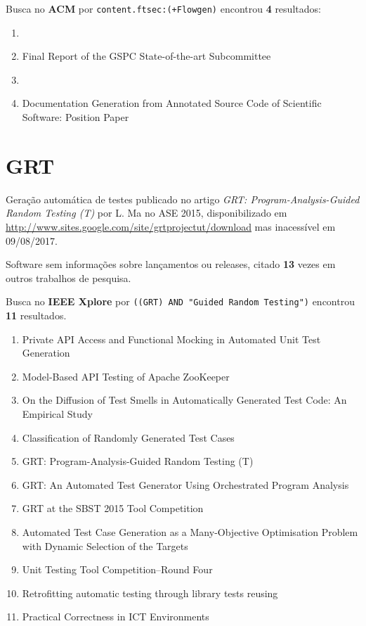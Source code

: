 Busca no {\bf ACM} por
\texttt{content.ftsec:(+Flowgen)}
encontrou {\bf 4}
resultados:

\begin{enumerate}
\item 
\item Final Report of the GSPC State-of-the-art Subcommittee
\item 
\item Documentation Generation from Annotated Source Code of Scientific Software: Position Paper
\end{enumerate}

\section{GRT}

Geração automática de testes
publicado no artigo {\it GRT: Program-Analysis-Guided Random Testing (T)}
por L. Ma
no ASE 2015,
disponibilizado em \url{http://www.sites.google.com/site/grtprojectut/download}
mas inacessível em 09/08/2017.

Software sem informações sobre lançamentos ou releases,
citado {\bf 13} vezes em outros trabalhos de pesquisa.

Busca no {\bf IEEE Xplore} por
\texttt{((GRT) AND "Guided Random Testing")}
encontrou {\bf 11}
resultados.

\begin{enumerate}
\item Private API Access and Functional Mocking in Automated Unit Test Generation
\item Model-Based API Testing of Apache ZooKeeper
\item On the Diffusion of Test Smells in Automatically Generated Test Code: An Empirical Study
\item Classification of Randomly Generated Test Cases
\item GRT: Program-Analysis-Guided Random Testing (T)
\item GRT: An Automated Test Generator Using Orchestrated Program Analysis
\item GRT at the SBST 2015 Tool Competition
\item Automated Test Case Generation as a Many-Objective Optimisation Problem with Dynamic Selection of the Targets
\item Unit Testing Tool Competition--Round Four
\item Retrofitting automatic testing through library tests reusing
\item Practical Correctness in ICT Environments
\end{enumerate}

